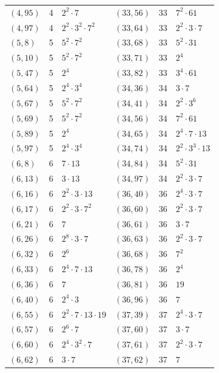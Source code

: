 \documentclass[11pt]{article}
\begin{document}
\begin{longtable}{@{}lrl@{\qquad}lrl@{}}
$(4,95)$ & 4 & $2^{2}\cdot 7$ & $(33,56)$ & 33 & $7^{2}\cdot 61$\\
$(4,97)$ & 4 & $2^{2}\cdot 3^{2}\cdot 7^{2}$ & $(33,64)$ & 33 & $2^{2}\cdot 3\cdot 7$\\
$(5,8)$ & 5 & $5^{2}\cdot 7^{2}$ & $(33,68)$ & 33 & $5^{2}\cdot 31$\\
$(5,10)$ & 5 & $5^{2}\cdot 7^{2}$ & $(33,71)$ & 33 & $2^{4}$\\
$(5,47)$ & 5 & $2^{4}$ & $(33,82)$ & 33 & $3^{4}\cdot 61$\\
$(5,64)$ & 5 & $2^{4}\cdot 3^{4}$ & $(34,36)$ & 34 & $3\cdot 7$\\
$(5,67)$ & 5 & $5^{2}\cdot 7^{2}$ & $(34,41)$ & 34 & $2^{2}\cdot 3^{6}$\\
$(5,69)$ & 5 & $5^{2}\cdot 7^{2}$ & $(34,56)$ & 34 & $7^{2}\cdot 61$\\
$(5,89)$ & 5 & $2^{4}$ & $(34,65)$ & 34 & $2^{4}\cdot 7\cdot 13$\\
$(5,97)$ & 5 & $2^{4}\cdot 3^{4}$ & $(34,74)$ & 34 & $2^{2}\cdot 3^{3}\cdot 13$\\
$(6,8)$ & 6 & $7\cdot 13$ & $(34,84)$ & 34 & $5^{2}\cdot 31$\\
$(6,13)$ & 6 & $3\cdot 13$ & $(34,97)$ & 34 & $2^{2}\cdot 3\cdot 7$\\
$(6,16)$ & 6 & $2^{2}\cdot 3\cdot 13$ & $(36,40)$ & 36 & $2^{4}\cdot 3\cdot 7$\\
$(6,17)$ & 6 & $2^{2}\cdot 3\cdot 7^{2}$ & $(36,60)$ & 36 & $2^{2}\cdot 3\cdot 7$\\
$(6,21)$ & 6 & $7$ & $(36,61)$ & 36 & $3\cdot 7$\\
$(6,26)$ & 6 & $2^{8}\cdot 3\cdot 7$ & $(36,63)$ & 36 & $2^{2}\cdot 3\cdot 7$\\
$(6,32)$ & 6 & $2^{6}$ & $(36,68)$ & 36 & $7^{2}$\\
$(6,33)$ & 6 & $2^{4}\cdot 7\cdot 13$ & $(36,78)$ & 36 & $2^{4}$\\
$(6,36)$ & 6 & $7$ & $(36,81)$ & 36 & $19$\\
$(6,40)$ & 6 & $2^{4}\cdot 3$ & $(36,96)$ & 36 & $7$\\
$(6,55)$ & 6 & $2^{2}\cdot 7\cdot 13\cdot 19$ & $(37,39)$ & 37 & $2^{4}\cdot 3\cdot 7$\\
$(6,57)$ & 6 & $2^{6}\cdot 7$ & $(37,60)$ & 37 & $3\cdot 7$\\
$(6,60)$ & 6 & $2^{4}\cdot 3^{2}\cdot 7$ & $(37,61)$ & 37 & $2^{2}\cdot 3\cdot 7$\\
$(6,62)$ & 6 & $3\cdot 7$ & $(37,62)$ & 37 & $7$\\

\end{longtable}
\end{document}
